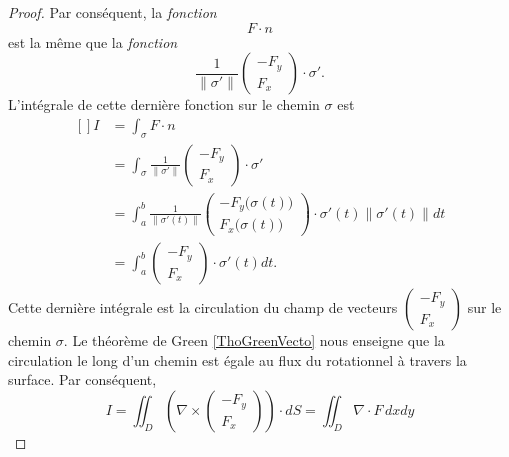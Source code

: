 \begin{proof}
    Par conséquent, la \emph{fonction}
    \begin{equation}
        F\cdot n
    \end{equation}
    est la même que la \emph{fonction} 
    \begin{equation}
        \frac{1}{ \| \sigma' \| }\begin{pmatrix}
            -F_y    \\ 
            F_x    
        \end{pmatrix}\cdot \sigma'.
    \end{equation}
    L'intégrale de cette dernière fonction sur le chemin $\sigma$ est 
    \begin{equation}
        \begin{aligned}[]
            I&=\int_{\sigma} F\cdot n\\
            &=\int_{\sigma}\frac{1}{ \| \sigma' \| }\begin{pmatrix}
                -F_y    \\ 
                F_x    
            \end{pmatrix}\cdot \sigma'\\
            &=  \int_a^b\frac{1}{ \| \sigma'(t)\| }\begin{pmatrix}
                -F_y\big( \sigma(t) \big)    \\ 
                F_x\big( \sigma(t) \big)
            \end{pmatrix}
            \cdot\sigma'(t)\| \sigma'(t) \|dt\\
            &=
            \int_a^b\begin{pmatrix}
                -F_y    \\ 
                F_x    
            \end{pmatrix}\cdot \sigma'(t)dt.
        \end{aligned}
    \end{equation}
    Cette dernière intégrale est la circulation du champ de vecteurs $\begin{pmatrix}
        -F_y    \\ 
        F_x    
    \end{pmatrix}$ sur le chemin $\sigma$. Le théorème de Green \ref{ThoGreenVecto} nous enseigne que la circulation le long d'un chemin est égale au flux du rotationnel à travers la surface. Par conséquent,
    \begin{equation}
        I=\iint_D\left( \nabla\times\begin{pmatrix}
            -F_y    \\ 
            F_x    
        \end{pmatrix}\right)\cdot dS=\iint_D\nabla\cdot F\, dxdy
    \end{equation}
    

\end{proof}

